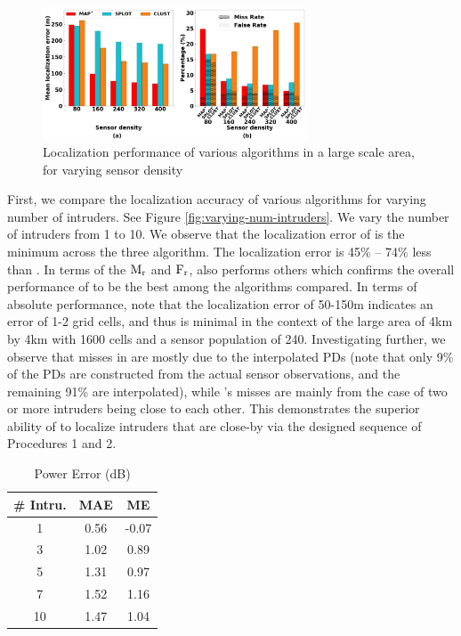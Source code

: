\begin{figure}[ht]
	\centering
	\includegraphics[width=0.7\textwidth]{chapters/ipsn/figures/splat-vary-sendensity.png}
	\caption{Localization performance of various algorithms in a large scale area, for varying sensor density}
	\label{fig:varying-num-sendensity}
\end{figure}

  First, we compare the
localization accuracy of various algorithms for varying number of
intruders.  See Figure \ref{fig:varying-num-intruders}. We vary the
number of intruders from 1 to 10. We observe that the localization
error of \ouralgo is the minimum across the three algorithm. 
The localization error is 45\% -- 74\% less than \splot.
In terms of the $\mathrm{M_{r}}$ and $\mathrm{F_{r}}$, \ouralgo also performs others which confirms the overall performance
of \ouralgo to be the best among the algorithms compared. In terms of
absolute performance, note that the localization error of 50-150m
indicates an error of 1-2 grid cells, and thus is minimal in the
context of the large area of 4km by 4km with 1600 cells and a sensor
population of 240. Investigating further, we observe that misses in
\ouralgo are mostly due to the interpolated PDs (note that only 9\% of
the PDs are constructed from the actual sensor observations, and the
remaining 91\% are interpolated), while \splot's misses are mainly
from the case of two or more intruders being close to each other. This
demonstrates the superior ability of \ouralgo to localize intruders
that are close-by via the designed sequence of Procedures 1 and 2.


\begin{table}
	\caption{\ouralgo Power Error (dB) }
	\centering
	\begin{tabular}{c c c} 
		\hline\hline
		\# Intru. & MAE & ME \\ [0.5ex]
		\hline
		1 & 0.56  & -0.07  \\ 
		3 & 1.02  & 0.89 \\
		5 & 1.31  & 0.97 \\
		7 & 1.52  & 1.16 \\
		10 & 1.47 & 1.04 \\
		\hline
	\end{tabular}
	\label{table:splat-power-error}
\end{table}

